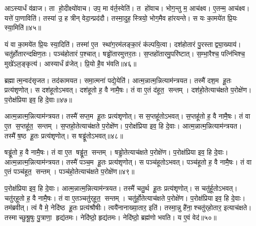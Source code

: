 आऽस्यार्धं व॑व्राज।
ता हो॒दीक्ष्यो॑वाच।
उप॒ मा व॑र्त॒स्वेति॑।
त हो॑वाच।
भोग॒न्तु म॒ आच॑क्ष्व।
ए॒तन्म॒ आच॑क्ष्व।
यत्ते॑ पा॒णाविति॑।
तस्या॑ उ॒ ह त्रीन् वेदा॒न्प्रद॑दौ।
तस्मा॒दुह॒ स्त्रियो॒ भोग॒मैव हा॑रयन्ते।
स यः का॒मये॑त प्रि॒यः स्या॒मिति॑॥४५॥

यं वा का॒मये॑त प्रि॒यः स्या॒दिति॑।
तस्मा॑ ए॒त स्था॑ग॒रम॑लङ्का॒रं क॑ल्पयि॒त्वा।
दश॑होतारं पु॒रस्ताद्व्या॒ख्याय॑।
चतु॑र्\mbox{}होतारन्दक्षिण॒तः।
पञ्च॑होतारं प॒श्चात्।
षड्ढो॑तारमुत्तर॒तः।
स॒प्तहो॑तारमु॒परि॑ष्टात्।
स॒म्भा॒रैश्च॒ पत्नि॑भिश्च॒ मुखे॑ऽल॒ङ्कृत्य॑।
आस्यार्धं व्र॑जेत्।
प्रि॒यो है॒व भ॑वति॥४६॥\anuvakamend[अ॒या॒न्य॒ल॒ङ्कृत्य॑ स्या॒मिति॑ भवति]

ब्रह्मात्म॒न्वद॑सृजत।
तद॑कामयत।
समा॒त्मना॑ पद्ये॒येति॑।
आत्म॒न्नात्म॒न्नित्याम॑न्त्रयत।
तस्मै॑ दश॒म हू॒तः प्रत्य॑शृणोत्।
स दश॑हूतोऽभवत्।
दश॑हूतो ह॒ वै नामै॒षः।
तं वा ए॒तं द॑हूत॒ सन्तम्।
दश॑हो॒तेत्याच॑क्षते प॒रोक्षे॑ण।
प॒रोक्ष॑प्रिया इव॒ हि दे॒वाः॥४७॥

आत्म॒न्नात्म॒न्नित्याम॑न्त्रयत।
तस्मै॑ सप्त॒म हू॒तः प्रत्य॑शृणोत्।
स स॒प्तहू॑तोऽभवत्।
स॒प्तहू॑तो ह॒ वै नामै॒षः।
तं वा ए॒त स॒प्तहू॑त॒ सन्तम्।
स॒प्तहो॒तेत्याच॑क्षते प॒रोक्षे॑ण।
प॒रोक्ष॑प्रिया इव॒ हि दे॒वाः।
आत्म॒न्नात्म॒न्नित्याम॑न्त्रयत।
तस्मै॑ ष॒ष्ठ हू॒तः प्रत्य॑शृणोत्।
स षड्ढू॑तोऽभवत्॥४८॥

षड्ढू॑तो ह॒ वै नामै॒षः।
तं वा ए॒त षड्ढू॑त॒ सन्तम्।
षड्ढो॒तेत्याच॑क्षते प॒रोक्षे॑ण।
प॒रोक्ष॑प्रिया इव॒ हि दे॒वाः।
आत्म॒न्नात्म॒न्नित्याम॑न्त्रयत।
तस्मै॑ पञ्च॒म हू॒तः प्रत्य॑शृणोत्।
स पञ्च॑हूतोऽभवत्।
पञ्च॑हूतो ह॒ वै नामै॒षः।
तं वा ए॒तं पञ्च॑हूत॒ सन्तम्।
पञ्च॑हो॒तेत्याच॑क्षते प॒रोक्षे॑ण॥४९॥

प॒रोक्ष॑प्रिया इव॒ हि दे॒वाः।
आत्म॒न्नात्म॒न्नित्याम॑न्त्रयत।
तस्मै॑ चतु॒र्थ हू॒तः प्रत्य॑शृणोत्।
स चतु॑र्\mbox{}हूतोऽभवत्।
चतु॑र्‌हूतो ह॒ वै नामै॒षः।
तं वा ए॒तञ्चतु॑र्‌हूत॒ सन्तम्।
चतु॑र्हो॒तेत्याच॑क्षते प॒रोक्षे॑ण।
प॒रोक्ष॑प्रिया इव॒ हि दे॒वाः।
तम॑ब्रवीत्।
त्वं वै मे॒ नेदि॑ष्ठ हू॒तः प्रत्य॑श्रौषीः।
त्वयै॑नानाख्या॒तार॒ इति॑।
तस्मा॒न्नु है॑ना॒श्चतु॑र्‌होतार॒ इत्याच॑क्षते।
तस्माच्छुश्रू॒षुः पु॒त्राणा॒ हृद्य॑तमः।
नेदि॑ष्ठो॒ हृद्य॑तमः।
नेदि॑ष्ठो॒ ब्रह्म॑णो भवति।
य ए॒वं वेद॑॥५०॥\anuvakamend[दे॒वाष्षड्ढू॑तोऽभव॒त्पञ्च॑हो॒तेत्याच॑क्षते प॒रोक्षे॑णाश्रौषी॒ष्षट्च॑]




\clearpage
{}
\setcounter{anuvakam}{0}

